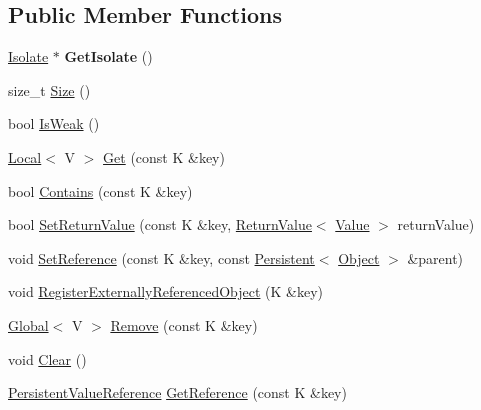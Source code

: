 \subsection*{Public Member Functions}
\begin{DoxyCompactItemize}
\item 
\hyperlink{classv8_1_1Isolate}{Isolate} $\ast$ {\bfseries Get\+Isolate} ()\hypertarget{classv8_1_1PersistentValueMapBase_a80da7adc6e8bdb166912075346116978}{}\label{classv8_1_1PersistentValueMapBase_a80da7adc6e8bdb166912075346116978}

\item 
size\+\_\+t \hyperlink{classv8_1_1PersistentValueMapBase_ade5c5db2a968fdabe073649e85b837eb}{Size} ()
\item 
bool \hyperlink{classv8_1_1PersistentValueMapBase_a9f824b13dd30605589508db2740dd678}{Is\+Weak} ()
\item 
\hyperlink{classv8_1_1Local}{Local}$<$ V $>$ \hyperlink{classv8_1_1PersistentValueMapBase_a16b8f906ea42036c2f37d44813bf2a72}{Get} (const K \&key)
\item 
bool \hyperlink{classv8_1_1PersistentValueMapBase_a8c68e5f99c4042541c6d32232c97282a}{Contains} (const K \&key)
\item 
bool \hyperlink{classv8_1_1PersistentValueMapBase_a85201649d2bbd0ffdebe8be3d5c6447a}{Set\+Return\+Value} (const K \&key, \hyperlink{classv8_1_1ReturnValue}{Return\+Value}$<$ \hyperlink{classv8_1_1Value}{Value} $>$ return\+Value)
\item 
void \hyperlink{classv8_1_1PersistentValueMapBase_a6fa5f720b283dd9fa626a67e7687dcd0}{Set\+Reference} (const K \&key, const \hyperlink{classv8_1_1Persistent}{Persistent}$<$ \hyperlink{classv8_1_1Object}{Object} $>$ \&parent)
\item 
void \hyperlink{classv8_1_1PersistentValueMapBase_a7d1cd63172b997dfaac9d0f009edd709}{Register\+Externally\+Referenced\+Object} (K \&key)
\item 
\hyperlink{classv8_1_1Global}{Global}$<$ V $>$ \hyperlink{classv8_1_1PersistentValueMapBase_abd75a4c050416712167ba0bb9eace097}{Remove} (const K \&key)
\item 
void \hyperlink{classv8_1_1PersistentValueMapBase_a1bf074e7a7c24713c9a3d40ddce89e74}{Clear} ()
\item 
\hyperlink{classv8_1_1PersistentValueMapBase_1_1PersistentValueReference}{Persistent\+Value\+Reference} \hyperlink{classv8_1_1PersistentValueMapBase_a52e74c69b94c7ce77a65af9f32d68af4}{Get\+Reference} (const K \&key)
\end{DoxyCompactItemize}
